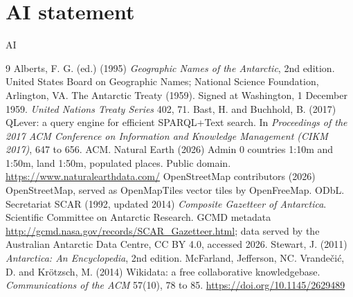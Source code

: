 \documentclass[11pt,a4paper]{article}
\begin{document}
\section*{AI statement}
{{AI}}

\begin{thebibliography}{9}
 Alberts, F. G. (ed.) (1995) \textit{Geographic Names of the Antarctic}, 2nd edition. United States Board on Geographic Names; National Science Foundation, Arlington, VA.
 The Antarctic Treaty (1959). Signed at Washington, 1 December 1959. \textit{United Nations Treaty Series} 402, 71.
 Bast, H. and Buchhold, B. (2017) QLever: a query engine for efficient SPARQL+Text search. In \textit{Proceedings of the 2017 ACM Conference on Information and Knowledge Management (CIKM 2017)}, 647 to 656. ACM.
 Natural Earth (2026) Admin 0 countries 1:10m and 1:50m, land 1:50m, populated places. Public domain. \url{https://www.naturalearthdata.com/}
 OpenStreetMap contributors (2026) OpenStreetMap, served as OpenMapTiles vector tiles by OpenFreeMap. ODbL.
 Secretariat SCAR (1992, updated 2014) \textit{Composite Gazetteer of Antarctica}. Scientific Committee on Antarctic Research. GCMD metadata \url{http://gcmd.nasa.gov/records/SCAR_Gazetteer.html}; data served by the Australian Antarctic Data Centre, CC BY 4.0, accessed 2026.
 Stewart, J. (2011) \textit{Antarctica: An Encyclopedia}, 2nd edition. McFarland, Jefferson, NC.
 Vrande\v{c}i\'c, D. and Kr\"otzsch, M. (2014) Wikidata: a free collaborative knowledgebase. \textit{Communications of the ACM} 57(10), 78 to 85. \url{https://doi.org/10.1145/2629489}
\end{thebibliography}
\end{document}
